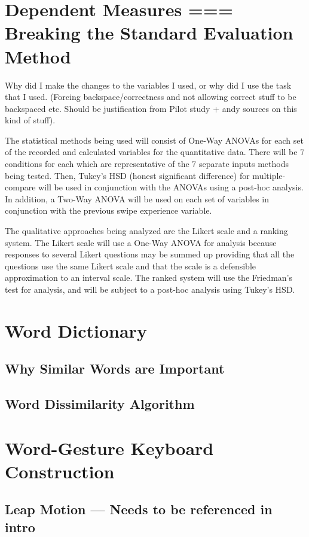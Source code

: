 \section{Dependent Measures === Breaking the Standard Evaluation Method}

Why did I make the changes to the variables I used, or why did I use the task that I used. (Forcing backspace/correctness and not allowing correct stuff to be backspaced etc. Should be justification from Pilot study + andy sources on this kind of stuff).

The statistical methods being used will consist of One-Way ANOVAs for each set of the recorded and calculated variables for the quantitative data. There will be 7 conditions for each which are representative of the 7 separate inputs methods being tested. Then, Tukey's HSD (honest significant difference) for multiple-compare will be used in conjunction with the ANOVAs using a post-hoc analysis. In addition, a Two-Way ANOVA will be used on each set of variables in conjunction with the previous swipe experience variable.

The qualitative approaches being analyzed are the Likert scale and a ranking system. The Likert scale will use a One-Way ANOVA for analysis because responses to several Likert questions may be summed up providing that all the questions use the same Likert scale and that the scale is a defensible approximation to an interval scale. The ranked system will use the Friedman's test for analysis, and will be subject to a post-hoc analysis using Tukey's HSD.


\section{Word Dictionary}

\subsection{Why Similar Words are Important}

\subsection {Word Dissimilarity Algorithm}

\section{Word-Gesture Keyboard Construction}

\subsection{Leap Motion --- Needs to be referenced in intro}


